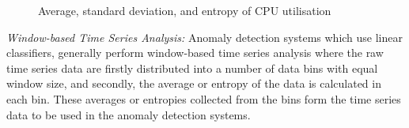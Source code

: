 \begin{figure}[!h]
  \centering
   {}
     \hspace{0.9cm}
      {}
        \hspace{0.9cm}
         {}
   \caption{Average, standard deviation, and entropy of CPU utilisation}
  \label{fig:avg_sd_entropy}
\end{figure}

\textit{Window-based Time Series Analysis:} 
Anomaly detection systems which use linear classifiers, generally perform window-based time series analysis where the raw time series data are firstly distributed into a number of data bins with equal window size, and secondly, the average or entropy of the data is calculated in each bin. These averages or entropies collected from the bins form the time series data to be used in the anomaly detection systems.
